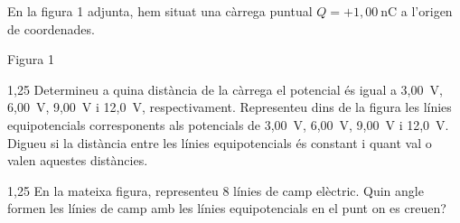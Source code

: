 En la figura 1 adjunta, hem situat una càrrega puntual $Q = +1,00\ \mathrm{nC}$ a l'origen de coordenades.

\begin{center}\small Figura 1\end{center}

\begin{apartat}{1,25}
Determineu a quina distància de la càrrega el potencial és igual a 3,00~V, 6,00~V, 9,00~V i 12,0~V, respectivament. Representeu dins de la figura les línies equipotencials corresponents als potencials de 3,00~V, 6,00~V, 9,00~V i 12,0~V. Digueu si la distància entre les línies equipotencials és constant i quant val o valen aquestes distàncies.
\end{apartat}

\begin{apartat}{1,25}
En la mateixa figura, representeu 8 línies de camp elèctric. Quin angle formen les línies de camp amb les línies equipotencials en el punt on es creuen?
\end{apartat}

